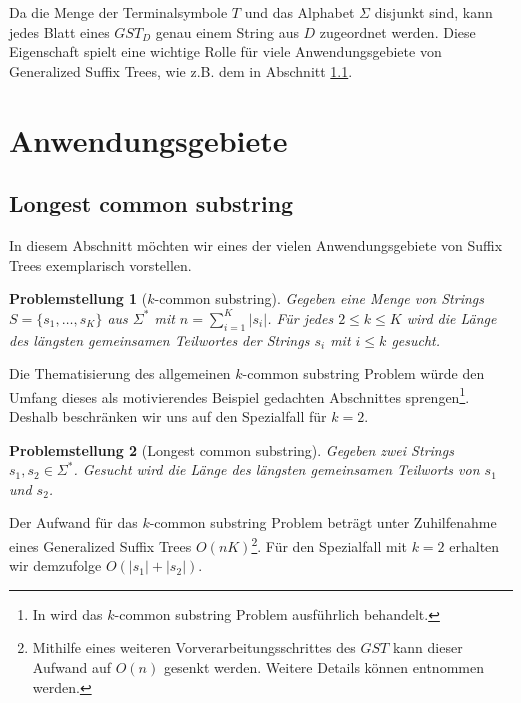 \documentclass[12pt]{report}
\newtheorem*{problem}{Problemstellung}
\newcommand{\abs}[1]{\left|#1\right|}
\begin{document}
Da die Menge der Terminalsymbole $T$ und das Alphabet $\Sigma$ disjunkt sind, kann jedes Blatt eines $GST_D$ genau einem String aus $D$ zugeordnet werden. Diese Eigenschaft spielt eine wichtige Rolle für viele Anwendungsgebiete von Generalized Suffix Trees, wie z.B. dem in Abschnitt \ref{sec:LongestCommonSubstring}.

\section{Anwendungsgebiete}
\label{sec:Anwendungsgebiete}

\subsection{Longest common substring}
\label{sec:LongestCommonSubstring}

In diesem Abschnitt möchten wir eines der vielen Anwendungsgebiete von Suffix Trees exemplarisch vorstellen.

\begin{problem}[$k$-common substring]
Gegeben eine Menge von Strings $S = \{s_1, \dots, s_K\}$ aus $\Sigma^*$ mit $n = \sum_{i = 1}^K \abs{s_i}$. Für jedes $2 \leq k \leq K$ wird die Länge des längsten gemeinsamen Teilwortes der Strings $s_i$ mit $i \leq k$ gesucht.
\end{problem}

Die Thematisierung des allgemeinen $k$-common substring Problem würde den Umfang dieses als motivierendes Beispiel gedachten Abschnittes sprengen\footnote{In \cite{Gusfield1997} wird das $k$-common substring Problem ausführlich behandelt.}. Deshalb beschränken wir uns auf den Spezialfall für $k = 2$.

\begin{problem}[Longest common substring]
Gegeben zwei Strings $s_1, s_2 \in \Sigma^*$. Gesucht wird die Länge des längsten gemeinsamen Teilworts von $s_1$ und $s_2$.
\end{problem}

Der Aufwand für das $k$-common substring Problem beträgt unter Zuhilfenahme eines Generalized Suffix Trees $O(nK)$\footnote{Mithilfe eines weiteren Vorverarbeitungsschrittes des $GST$ kann dieser Aufwand auf $O(n)$ gesenkt werden. Weitere Details können \cite{Gusfield1997} entnommen werden.}. Für den Spezialfall mit $k = 2$ erhalten wir demzufolge $O(\abs{s_1} + \abs{s_2})$.
\end{document}
